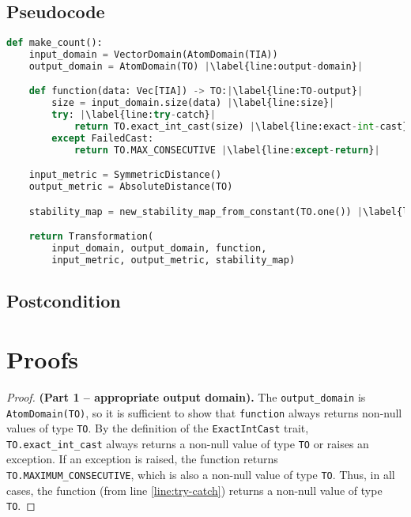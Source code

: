 \documentclass{article}
\begin{document}
\subsection*{Pseudocode}
\begin{lstlisting}[language = Python, escapechar=|]
def make_count():
    input_domain = VectorDomain(AtomDomain(TIA))
    output_domain = AtomDomain(TO) |\label{line:output-domain}|

    def function(data: Vec[TIA]) -> TO:|\label{line:TO-output}|
        size = input_domain.size(data) |\label{line:size}|
        try: |\label{line:try-catch}|
            return TO.exact_int_cast(size) |\label{line:exact-int-cast}|
        except FailedCast:
            return TO.MAX_CONSECUTIVE |\label{line:except-return}|

    input_metric = SymmetricDistance()
    output_metric = AbsoluteDistance(TO)

    stability_map = new_stability_map_from_constant(TO.one()) |\label{line:stability-map}|

    return Transformation(
        input_domain, output_domain, function,
        input_metric, output_metric, stability_map)
\end{lstlisting}

\subsection*{Postcondition}

\section{Proofs}

\begin{proof} \textbf{(Part 1 -- appropriate output domain).}
    The \texttt{output\_domain} is \texttt{AtomDomain(TO)}, so it is sufficient to show that \texttt{function} always returns non-null values of type \texttt{TO}.
    By the definition of the \texttt{ExactIntCast} trait, \texttt{TO.exact\_int\_cast} always returns a non-null value of type \texttt{TO} or raises an exception.
    If an exception is raised, the function returns \texttt{TO.MAXIMUM\_CONSECUTIVE}, which is also a non-null value of type \texttt{TO}.
    Thus, in all cases, the function (from line \ref{line:try-catch}) returns a non-null value of type \texttt{TO}.
\end{proof}
\end{document}
